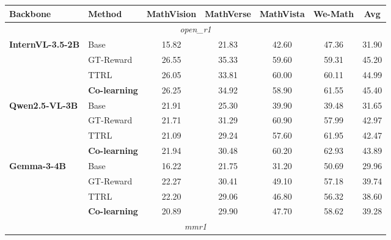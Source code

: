 \begin{table}[t]\centering\small
\setlength{\tabcolsep}{5pt}\renewcommand{\arraystretch}{1.12}
\begin{tabular}{ll ccccc}
\toprule
Backbone & Method & MathVision & MathVerse & MathVista & We-Math & \textbf{Avg} \\
\midrule
\multicolumn{7}{c}{\textit{open\_r1}}\\
\midrule
\textbf{InternVL-3.5-2B} & Base & 15.82 & 21.83 & 42.60 & 47.36 & 31.90 \\
 & GT-Reward & \cellcolor{heat!58}26.55 & \cellcolor{heat!58}35.33 & \cellcolor{heat!39}59.60 & \cellcolor{heat!6}59.31 & \cellcolor{heat!33}45.20 \\
 & TTRL & \cellcolor{heat!6}26.05 & \cellcolor{heat!6}33.81 & \cellcolor{heat!58}60.00 & \cellcolor{heat!25}60.11 & \cellcolor{heat!6}44.99 \\
 & \textbf{Co-learning} & \cellcolor{heat!27}26.25 & \cellcolor{heat!44}34.92 & \cellcolor{heat!6}58.90 & \cellcolor{heat!58}61.55 & \cellcolor{heat!58}45.40 \\
\textbf{Qwen2.5-VL-3B} & Base & 21.91 & 25.30 & 39.90 & 39.48 & 31.65 \\
 & GT-Reward & \cellcolor{heat!44}21.71 & \cellcolor{heat!58}31.29 & \cellcolor{heat!58}60.90 & \cellcolor{heat!6}57.99 & \cellcolor{heat!24}42.97 \\
 & TTRL & \cellcolor{heat!6}21.09 & \cellcolor{heat!6}29.24 & \cellcolor{heat!6}57.60 & \cellcolor{heat!48}61.95 & \cellcolor{heat!6}42.47 \\
 & \textbf{Co-learning} & \cellcolor{heat!58}21.94 & \cellcolor{heat!37}30.48 & \cellcolor{heat!47}60.20 & \cellcolor{heat!58}62.93 & \cellcolor{heat!58}43.89 \\
\textbf{Gemma-3-4B} & Base & 16.22 & 21.75 & 31.20 & 50.69 & 29.96 \\
 & GT-Reward & \cellcolor{heat!58}22.27 & \cellcolor{heat!58}30.41 & \cellcolor{heat!58}49.10 & \cellcolor{heat!25}57.18 & \cellcolor{heat!58}39.74 \\
 & TTRL & \cellcolor{heat!55}22.20 & \cellcolor{heat!6}29.06 & \cellcolor{heat!6}46.80 & \cellcolor{heat!6}56.32 & \cellcolor{heat!6}38.60 \\
 & \textbf{Co-learning} & \cellcolor{heat!6}20.89 & \cellcolor{heat!38}29.90 & \cellcolor{heat!26}47.70 & \cellcolor{heat!58}58.62 & \cellcolor{heat!37}39.28 \\
\midrule
\multicolumn{7}{c}{\textit{mmr1}}\\

\end{tabular}
\end{table}
